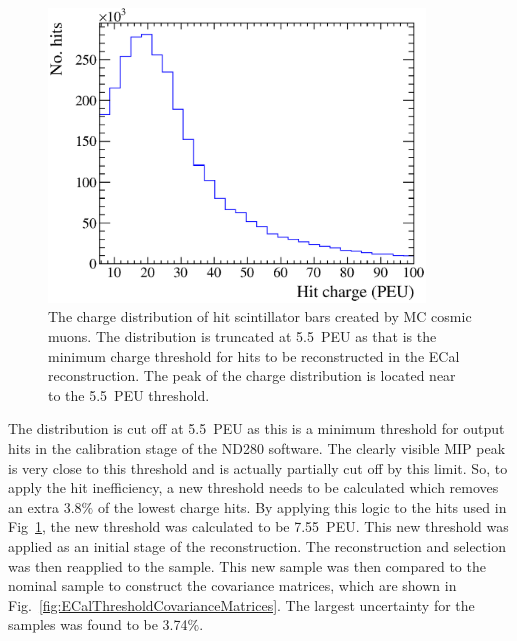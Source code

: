\begin{figure}[b!]
  \centering
  \includegraphics[width=10cm]{images/measurement/systematics/detector/threshold/hit_charge_cosmic_MC_PEU.eps}
  \caption{The charge distribution of hit scintillator bars created by MC cosmic muons.  The distribution is truncated at 5.5~PEU as that is the minimum charge threshold for hits to be reconstructed in the ECal reconstruction.  The peak of the charge distribution is located near to the 5.5~PEU threshold.}
  \label{fig:HitChargeCosmicMCPEU}
\end{figure}
The distribution is cut off at 5.5~PEU as this is a minimum threshold for output hits in the calibration stage of the ND280 software.  The clearly visible MIP peak is very close to this threshold and is actually partially cut off by this limit.  So, to apply the hit inefficiency, a new threshold needs to be calculated which removes an extra 3.8$\%$ of the lowest charge hits.  By applying this logic to the hits used in Fig~\ref{fig:HitChargeCosmicMCPEU}, the new threshold was calculated to be 7.55~PEU.  This new threshold was applied as an initial stage of the reconstruction.  The reconstruction and selection was then reapplied to the sample.  This new sample was then compared to the nominal sample to construct the covariance matrices, which are shown in Fig.~\ref{fig:ECalThresholdCovarianceMatrices}.  The largest uncertainty for the samples was found to be 3.74$\%$.
